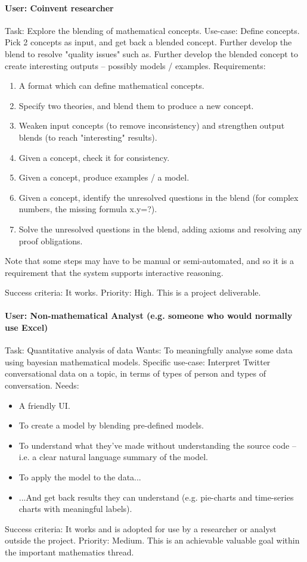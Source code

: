\begin{appendices}
\paragraph{User: Coinvent researcher}
Task: Explore the blending of mathematical concepts.      
Use-case: Define concepts. Pick 2 concepts as input, and get back a blended concept. Further develop the blend to resolve "quality issues" such as.
Further develop the blended concept to create interesting outputs -- possibly models / examples.   
Requirements: 
\begin{enumerate}
\item A format which can define mathematical concepts.
\item Specify two theories, and blend them to produce a new concept.
\item Weaken input concepts (to remove inconsistency) and strengthen output blends (to reach "interesting" results). 
\item Given a concept, check it for consistency.
\item Given a concept, produce examples / a model.
\item Given a concept, identify the unresolved questions in the blend (for complex numbers, the missing formula x.y=?).
\item Solve the unresolved questions in the blend, adding axioms and resolving any proof obligations.
\end{enumerate}
Note that some steps may have to be manual or semi-automated, and so it is a requirement that the
system supports interactive reasoning.

Success criteria: It works.       
Priority: High. This is a project deliverable.
 
 
\paragraph{User: Non-mathematical Analyst (e.g. someone who would normally use Excel)}  
Task: Quantitative analysis of data   
Wants: To meaningfully analyse some data using bayesian mathematical models.   
Specific use-case: Interpret Twitter conversational data on a topic, in terms of types of person and types of conversation.   
Needs:
\begin{itemize}
 \item A friendly UI.
 \item To create a model by blending pre-defined models.
 \item To understand what they've made without understanding the source code -- i.e. a clear natural language summary of the model.
 \item To apply the model to the data...
 \item ...And get back results they can understand (e.g. pie-charts and time-series charts with meaningful labels).
\end{itemize}
Success criteria: It works and is adopted for use by a researcher or analyst outside the project.   
Priority: Medium. This is an achievable valuable goal within the important mathematics thread.



\end{appendices}
